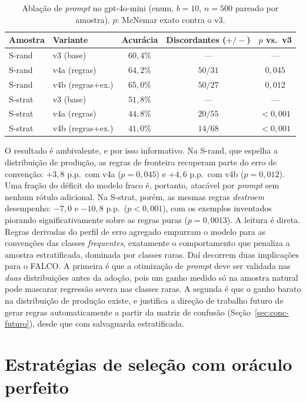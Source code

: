 \begin{table}[htb]
\centering
\caption{Ablação de \textit{prompt} no gpt-4o-mini (enum, $b=10$,
$n=500$ pareado por amostra). $p$: McNemar exato contra o v3.}
\label{tab:e0p}
\begin{tabular}{llccc}
\toprule
Amostra & Variante & Acurácia & Discordantes ($+/-$) & $p$ vs.\ v3 \\
\midrule
S-rand  & v3 (base)          & $60{,}4\%$ & ---     & --- \\
S-rand  & v4a (regras)       & $64{,}2\%$ & $50/31$ & $0{,}045$ \\
S-rand  & v4b (regras+ex.)   & $65{,}0\%$ & $50/27$ & $0{,}012$ \\
\midrule
S-strat & v3 (base)          & $51{,}8\%$ & ---     & --- \\
S-strat & v4a (regras)       & $44{,}8\%$ & $20/55$ & $<0{,}001$ \\
S-strat & v4b (regras+ex.)   & $41{,}0\%$ & $14/68$ & $<0{,}001$ \\
\bottomrule
\end{tabular}
\end{table}

O resultado é ambivalente, e por isso informativo. Na S-rand, que espelha a distribuição de produção, as regras de fronteira
recuperam parte do erro de convenção: $+3{,}8$ p.p.\ com v4a ($p=0{,}045$) e
$+4{,}6$ p.p.\ com v4b ($p=0{,}012$). Uma fração do déficit do modelo fraco é,
portanto, atacável por \textit{prompt} sem nenhum rótulo adicional.
Na S-strat, porém, as mesmas regras \emph{destroem} desempenho: $-7{,}0$ e
$-10{,}8$ p.p.\ ($p<0{,}001$), com os exemplos inventados piorando
significativamente sobre as regras puras ($p=0{,}0013$). A leitura é direta. Regras derivadas do perfil de erro agregado empurram o
modelo para as convenções das classes \emph{frequentes}, exatamente o
comportamento que penaliza a amostra estratificada, dominada por classes
raras. Daí decorrem duas implicações para o FALCO. A primeira é que a
otimização de
\textit{prompt} deve ser validada nas \emph{duas} distribuições antes da
adoção, pois um ganho medido só na amostra natural pode mascarar regressão
severa nas classes raras. A segunda é que o ganho barato na distribuição de
produção existe, e justifica a direção de trabalho futuro de gerar regras
automaticamente a partir da matriz de confusão (Seção~\ref{sec:conc-futuro}),
desde que com salvaguarda estratificada.

\section{Estratégias de seleção com oráculo perfeito}
\label{sec:res-e1}

